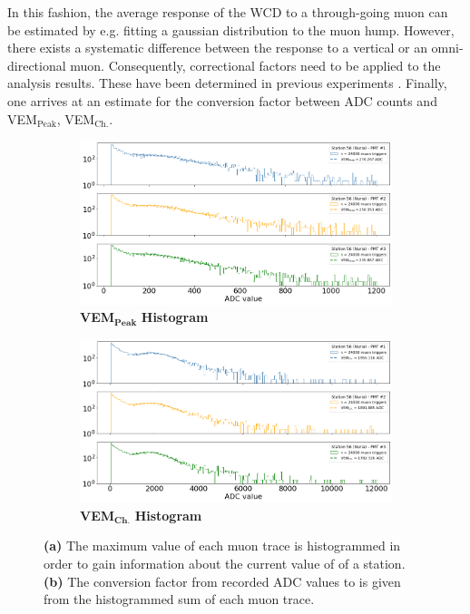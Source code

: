 In this fashion, the average response of the WCD to a through-going muon can be estimated by e.g. fitting a gaussian distribution to the muon hump. However, 
there exists a systematic difference between the response to a vertical or an omni-directional muon. Consequently, correctional factors need to be applied to the 
analysis results. These have been determined in previous experiments \cite{allison2002surface}. Finally, one arrives at an estimate for the conversion factor 
between ADC counts and VEM$_\text{Peak}$, VEM$_\text{Ch.}$.

\begin{figure}
	\begin{subfigure}[b]{0.5\textwidth}
		\centering
		\includegraphics[width=\textwidth]{./plots/offline_vem_peak.png}
		\caption{\textbf{VEM}$_\textbf{Peak}$ \textbf{Histogram}}
		\label{fig:offline-vem-peak}
	\end{subfigure}
	\hfill
	\begin{subfigure}[b]{0.5\textwidth}
		\centering
		\includegraphics[width=\textwidth]{./plots/offline_vem_charge.png}
		\caption{\textbf{VEM}$_\textbf{Ch.}$ \textbf{Histogram}}
		\label{fig:offline-vem-charge}
	\end{subfigure}
	\caption{\textbf{(a)} The maximum value of each muon trace is histogrammed in order to gain information about the current value of \Ipeak of a station. 
	\textbf{(b)} The conversion factor from recorded ADC values to \Qpeak is given from the histogrammed sum of each muon trace.}
	\label{fig:offline-calibration}
\end{figure}

